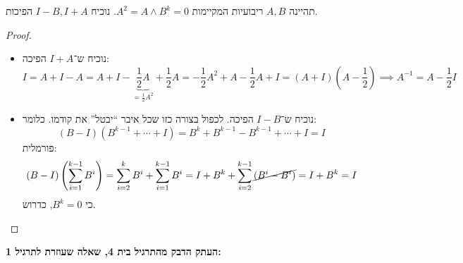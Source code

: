 \documentclass[]{article}
\newcommand\op    {^{-1}}
\newcommand\cl [1]    {\left ( #1 \right )}
\theoremstyle{definition}
\begin{document}
    \section{}
    תהיינה $A, B$ ריבועיות המקיימות $A^2 = A \land B^k = 0$. נוכיח $I - B, I + A$ הפיכות. \begin{proof}\, 
        \begin{itemize}
            \item נוכיח ש־$I + A$ הפיכה: 
            \[ I = A + I - A = A + I - \underbrace{\frac{1}{2}A}_{=\frac{1}{2}A^2} + \frac{1}{2} A = -\frac{1}{2}A^2 + A - \frac{1}{2}A + I = (A + I)\cl{A - \frac{1}{2}} \implies A\op = A - \frac{1}{2}I \]
            \item נוכיח ש־$I - B$ הפיכה. לכפול בצורה כזו שכל איבר ``יבטל'' את קודמו. כלומר: 
            \[ (B - I)(B^{k - 1} + \cdots + I) = B^{k} + B^{k - 1} - B^{k - 1} + \cdots + I = I \]
            פורמלית: 
            \[ (B - I)\cl{\sum_{i = 1}^{k - 1}B^i} = \sum_{i = 2}^{k}B^i + \sum_{i = 1}^{k - 1}B^i = I + B^k + \sum_{i = 2}^{k - 1} \cancel{(B^i - B^i)} = I + B^k = I \]
            כי $B^k = 0$, כדרוש. 
        \end{itemize}
    \end{proof}
    
    
    \dotfill
    
    \textbf{העתק הדבק מהתרגיל בית 4, שאלה שעוזרת לתרגיל 1: }
    
\end{document}
